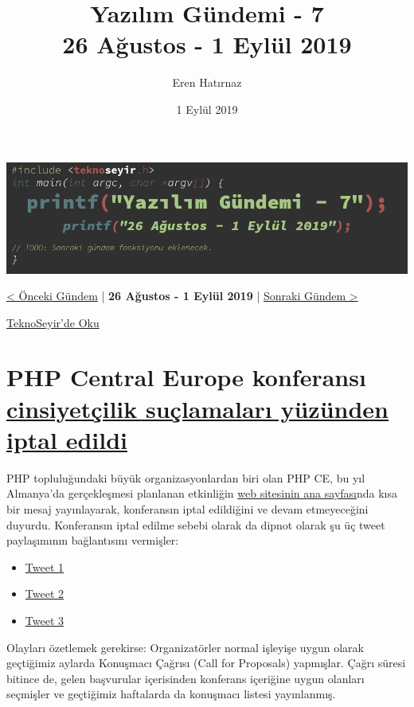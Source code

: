 \documentclass[11pt]{article}
\author{Eren Hatırnaz}
\date{1 Eylül 2019}
\title{Yazılım Gündemi - 7\\\medskip
\large 26 Ağustos - 1 Eylül 2019}
\begin{document}
\maketitle
\tableofcontents \clearpage\shorthandoff{=}

\begin{center}
\includegraphics[width=.9\linewidth]{gorseller/yazilim-gundemi-banner.png}
\end{center}

\begin{center}
\href{../06/yazilim-gundemi-06.pdf}{< Önceki Gündem} | \textbf{26 Ağustos - 1 Eylül 2019} | \href{../08/yazilim-gundemi-08.pdf}{Sonraki Gündem >}

\href{https://teknoseyir.com/blog/yazilim-gundemi-7-26-agustos-1-eylul-2019}{TeknoSeyir'de Oku}
\end{center}

\section{PHP Central Europe konferansı \href{https://www.theregister.co.uk/2019/08/27/php\_europe\_cancelled/}{cinsiyetçilik suçlamaları yüzünden iptal edildi}}
\label{sec:org1268ad3}
PHP topluluğundaki büyük organizasyonlardan biri olan PHP CE, bu yıl Almanya'da
gerçekleşmesi planlanan etkinliğin \href{http://2019.phpce.eu/en/}{web sitesinin ana sayfası}nda kısa bir mesaj
yayınlayarak, konferansın iptal edildiğini ve devam etmeyeceğini duyurdu.
Konferansın iptal edilme sebebi olarak da dipnot olarak şu üç tweet
paylaşımının bağlantısını vermişler:

\begin{itemize}
\item \href{https://twitter.com/KarlLHughes/status/1151525811616387073}{Tweet 1}
\item \href{https://twitter.com/Crell/status/1152368497823031296}{Tweet 2}
\item \href{https://twitter.com/Mark\_Baker/status/1154113051056099329}{Tweet 3}
\end{itemize}

Olayları özetlemek gerekirse: Organizatörler normal işleyişe uygun olarak
geçtiğimiz aylarda Konuşmacı Çağrısı (Call for Proposals) yapmışlar. Çağrı
süresi bitince de, gelen başvurular içerisinden konferans içeriğine uygun
olanları seçmişler ve geçtiğimiz haftalarda da konuşmacı listesi yayınlanmış.
\end{document}
